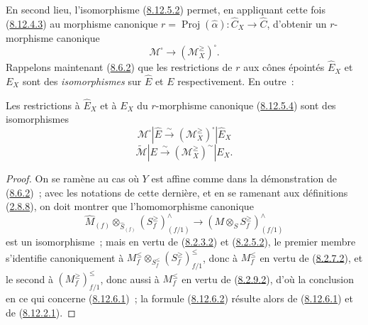 \begin{env}[8.12.5]
En second lieu, l'isomorphisme (\hyperref[II.8.12.5.2-fr]{8.12.5.2}) permet,
en appliquant cette fois (\hyperref[II.8.12.4.3-fr]{8.12.4.3}) au morphisme
canonique $r=\operatorname{Proj}(\widehat{\alpha}):\widehat{C}_X\to
\widehat{C}$, d'obtenir un $r$-morphisme canonique
\begin{equation}
\label{II.8.12.5.4-fr}
  \mathcal{M}^{\square}\to(\mathcal{M}_X^{\geq})^{\square}.
\tag{8.12.5.4}
\end{equation}
Rappelons maintenant (\hyperref[II.8.6.2-fr]{8.6.2}) que les restrictions de
$r$ aux cônes épointés $\widehat{E}_X$ et $E_X$ sont des \emph{isomorphismes}
sur $\widehat{E}$ et $E$ respectivement. En outre~:
\end{env}

\begin{proposition}[8.12.6]
\label{II.8.12.6-fr}
Les restrictions à $\widehat{E}_X$ et à $E_X$ du $r$-morphisme canonique
(\hyperref[II.8.12.5.4-fr]{8.12.5.4}) sont des isomorphismes
\begin{equation}
\label{II.8.12.6.1-fr}
  \mathcal{M}^{\square}|\widehat{E}
  \xrightarrow{\sim}(\mathcal{M}_X^{\geq})^{\square}|\widehat{E}_X
\tag{8.12.6.1}
\end{equation}
\begin{equation}
\label{II.8.12.6.2-fr}
  \widetilde{\mathcal{M}}|E
  \xrightarrow{\sim}(\mathcal{M}_X^{\geq})^{\sim}|E_X.
\tag{8.12.6.2}
\end{equation}
\end{proposition}

\begin{proof}
On se ramène au cas où $Y$ est affine comme dans la démonstration de
(\hyperref[II.8.6.2-fr]{8.6.2})~; avec les notations de cette dernière, et
en se ramenant aux définitions (\hyperref[II.2.8.8-fr]{2.8.8}), on doit
montrer que l'homomorphisme canonique
\[
  \widehat{M}_{(f)}\otimes_{\widehat{S}_{(f)}}
  (S_f^{\geq})_{(f/1)}^{\wedge}
  \to(M\otimes_S S_f^{\geq})_{(f/1)}^{\wedge}
\]
est un isomorphisme~; mais en vertu de
(\hyperref[II.8.2.3.2-fr]{8.2.3.2}) et
(\hyperref[II.8.2.5.2-fr]{8.2.5.2}), le premier membre s'identifie
canoniquement à
$M_f^{\leq}\otimes_{S_f^{\leq}}(S_f^{\geq})_{f/1}^{\leq}$, donc à
$M_f^{\leq}$ en vertu de (\hyperref[II.8.2.7.2-fr]{8.2.7.2}), et le second à
$(M_f^{\geq})_{f/1}^{\leq}$, donc aussi à $M_f^{\leq}$ en vertu de
(\hyperref[II.8.2.9.2-fr]{8.2.9.2}), d'où la conclusion en ce qui concerne
(\hyperref[II.8.12.6.1-fr]{8.12.6.1})~; la formule
(\hyperref[II.8.12.6.2-fr]{8.12.6.2}) résulte alors de
(\hyperref[II.8.12.6.1-fr]{8.12.6.1}) et de
(\hyperref[II.8.12.2.1-fr]{8.12.2.1}).
\end{proof}

